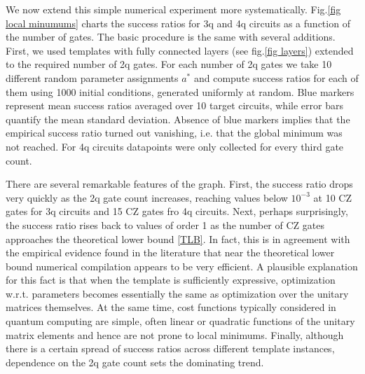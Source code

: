 \documentclass[draft, amsfonts, amssymb, aps, nofootinbib, twocolumn]{revtex4-2}
\newcommand{\CZ}{CZ }
\begin{document}
We now extend this simple numerical experiment more systematically. Fig.\ref{fig local minumums} charts the success ratios for 3q and 4q circuits as a function of the number of gates. The basic procedure is the same with several additions. First, we used templates with fully connected layers (see fig.\ref{fig layers}) extended to the required number of 2q gates. For each number of 2q gates we take 10 different random parameter assignments $a^*$ and compute success ratios for each of them using 1000 initial conditions, generated uniformly at random. Blue markers represent mean success ratios averaged over 10 target circuits, while error bars quantify the mean standard deviation. Absence of blue markers implies that the empirical success ratio turned out vanishing, i.e. that the global minimum was not reached. For 4q circuits datapoints were only collected for every third gate count.

There are several remarkable features of the graph. First, the success ratio drops very quickly as the 2q gate count increases, reaching values below $10^{-3}$ at 10 \CZ gates for 3q circuits and 15 \CZ gates fro 4q circuits. Next, perhaps surprisingly, the success ratio rises back to values of order 1 as the number of \CZ gates approaches the theoretical lower bound \eqref{TLB}. In fact, this is in agreement with the empirical evidence found in the literature \cite{Madden2021, Rakyta2021, Kiani2020} that near the theoretical lower bound numerical compilation appears to be very efficient. A plausible explanation for this fact \cite{Ge2022} is that when the template is sufficiently expressive, optimization w.r.t. parameters becomes essentially the same as optimization over the unitary matrices themselves. At the same time, cost functions typically considered in quantum computing are simple, often linear or quadratic functions of the unitary matrix elements and hence are not prone to local minimums. Finally, although there is a certain spread of success ratios across different template instances, dependence on the 2q gate count sets the dominating trend.
\end{document}
